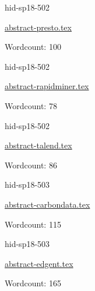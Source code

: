 

\begin{IU}

hid-sp18-502

\href{https://github.com/cloudmesh-community/hid-sp18-502/blob/master//technology/abstract-presto.tex}{abstract-presto.tex}

 

Wordcount: 100

\end{IU}



\begin{IU}

hid-sp18-502

\href{https://github.com/cloudmesh-community/hid-sp18-502/blob/master//technology/abstract-rapidminer.tex}{abstract-rapidminer.tex}

 

Wordcount: 78

\end{IU}



\begin{IU}

hid-sp18-502

\href{https://github.com/cloudmesh-community/hid-sp18-502/blob/master//technology/abstract-talend.tex}{abstract-talend.tex}

 

Wordcount: 86

\end{IU}



\begin{IU}

hid-sp18-503

\href{https://github.com/cloudmesh-community/hid-sp18-503/blob/master//technology/abstract-carbondata.tex}{abstract-carbondata.tex}

 

Wordcount: 115

\end{IU}



\begin{IU}

hid-sp18-503

\href{https://github.com/cloudmesh-community/hid-sp18-503/blob/master//technology/abstract-edgent.tex}{abstract-edgent.tex}

 

Wordcount: 165

\end{IU}

